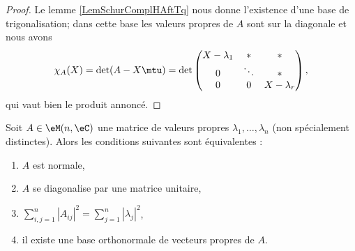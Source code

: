 \begin{proof}
    Le lemme \ref{LemSchurComplHAftTq} nous donne l'existence d'une base de trigonalisation; dans cette base les valeurs propres de \( A\) sont sur la diagonale et nous avons 
    \begin{equation}
        \chi_A(X)=\det(A-X\mtu)=\det\begin{pmatrix}
            X-\lambda_1    &   *    &   *    \\
            0    &   \ddots    &   *    \\
            0    &   0    &   X-\lambda_r
        \end{pmatrix},
    \end{equation}
    qui vaut bien le produit annoncé.
\end{proof}

\begin{theorem}    \label{ThogammwA}
    Soit \( A\in\eM(n,\eC)\) une matrice de valeurs propres \( \lambda_1,\ldots, \lambda_n\) (non spécialement distinctes). Alors les conditions suivantes sont équivalentes :
    \begin{enumerate}
        \item   \label{ItemJZhFPSi}
            \( A\) est normale,
        \item   \label{ItemJZhFPSii}
            \( A\) se diagonalise par une matrice unitaire,
        \item
            \( \sum_{i,j=1}^n| A_{ij} |^2=\sum_{j=1}^n| \lambda_j |^2\),
        \item
            il existe une base orthonormale de vecteurs propres de \( A\).
    \end{enumerate}
\end{theorem}

